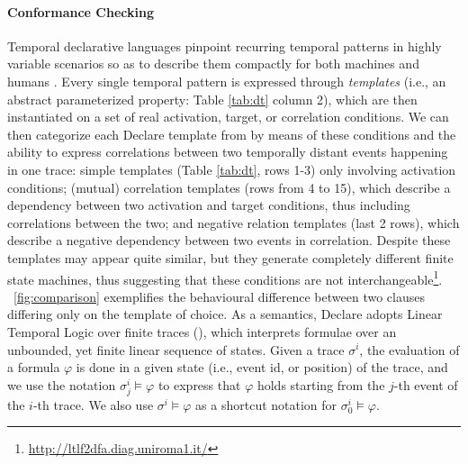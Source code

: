 \paragraph*{Conformance Checking}\label{sec:DAD} Temporal declarative languages 
pinpoint recurring temporal patterns in highly variable scenarios so as to describe them compactly for both machines and humans \cite{PichlerWZPMR11}.
Every single temporal pattern is expressed through \textit{templates} (i.e., an abstract parameterized property: Table \ref{tab:dt} column 2), which are then instantiated on a set of real activation, target, or correlation conditions. We can then categorize each Declare template from \cite{Li2020} by means of these conditions and the ability to express correlations between two temporally distant events happening in one %
trace: %
simple
 templates (Table \ref{tab:dt}, rows 1-3) only involving activation conditions; (mutual)
 correlation templates (rows from 4 to 15), which describe a dependency between two
activation and target conditions, thus including correlations between the two; and negative relation templates (last 2 rows), which describe a negative
dependency between two events in correlation. %
Despite %
these templates may appear quite similar, but they generate completely different finite state machines, thus suggesting that these conditions are not interchangeable\footnote{\url{http://ltlf2dfa.diag.uniroma1.it/}}. 
\figurename~\ref{fig:comparison} exemplifies the behavioural difference between two clauses differing only on the template of choice.
As a semantics, %
Declare adopts %
Linear Temporal Logic over finite traces (\LTLf), which interprets formulae over an unbounded, yet finite linear sequence of states. %
Given a trace $\sigma^i$, the evaluation of a formula $\varphi$ is done in a given state (i.e., event id, or position) of the trace, and we use the notation $\sigma^i_j\vDash\varphi$ to express that $\varphi$ holds starting from the $j$-th event of the $i$-th trace. We also use $\sigma^i\vDash\varphi$ as a shortcut notation for $\sigma^i_0\vDash\varphi$.  %
